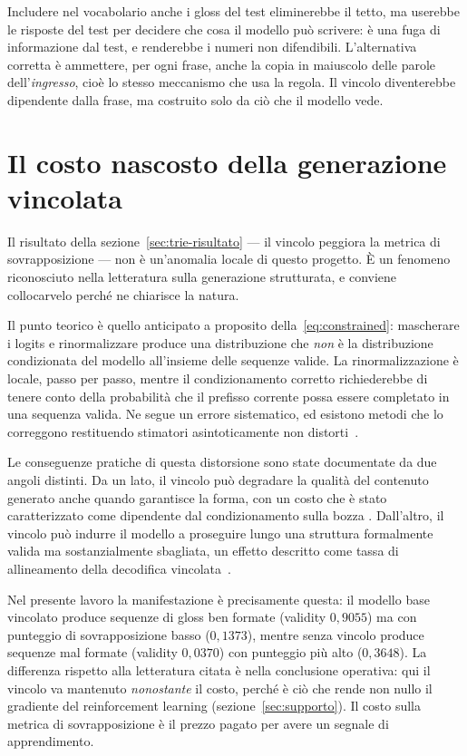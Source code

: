 Includere nel vocabolario anche i gloss del test eliminerebbe il tetto, ma
userebbe le risposte del test per decidere che cosa il modello può scrivere: è
una fuga di informazione dal test, e renderebbe i numeri non difendibili.
L'alternativa corretta è ammettere, per ogni frase, anche la copia in maiuscolo
delle parole dell'\emph{ingresso}, cioè lo stesso meccanismo che usa la regola.
Il vincolo diventerebbe dipendente dalla frase, ma costruito solo da ciò che il
modello vede.

\section{Il costo nascosto della generazione vincolata}

Il risultato della sezione~\ref{sec:trie-risultato} --- il vincolo peggiora la
metrica di sovrapposizione --- non è un'anomalia locale di questo progetto. È
un fenomeno riconosciuto nella letteratura sulla generazione strutturata, e
conviene collocarvelo perché ne chiarisce la natura.

Il punto teorico è quello anticipato a proposito della~\eqref{eq:constrained}:
mascherare i logits e rinormalizzare produce una distribuzione che \emph{non} è
la distribuzione condizionata del modello all'insieme delle sequenze valide. La
rinormalizzazione è locale, passo per passo, mentre il condizionamento corretto
richiederebbe di tenere conto della probabilità che il prefisso corrente possa
essere completato in una sequenza valida. Ne segue un errore sistematico, ed
esistono metodi che lo correggono restituendo stimatori asintoticamente non
distorti~\cite{ye2504}.

Le conseguenze pratiche di questa distorsione sono state documentate da due
angoli distinti. Da un lato, il vincolo può degradare la qualità del contenuto
generato anche quando garantisce la forma, con un costo che è stato
caratterizzato come dipendente dal condizionamento sulla bozza
\cite{reddy2603}. Dall'altro, il vincolo può indurre il modello a proseguire
lungo una struttura formalmente valida ma sostanzialmente sbagliata, un effetto
descritto come tassa di allineamento della decodifica
vincolata~\cite{zhou2604}.

Nel presente lavoro la manifestazione è precisamente questa: il modello base
vincolato produce sequenze di gloss ben formate (validity $0{,}9055$) ma con
punteggio di sovrapposizione basso ($0{,}1373$), mentre senza vincolo produce
sequenze mal formate (validity $0{,}0370$) con punteggio più alto ($0{,}3648$).
La differenza rispetto alla letteratura citata è nella conclusione operativa:
qui il vincolo va mantenuto \emph{nonostante} il costo, perché è ciò che rende
non nullo il gradiente del reinforcement learning
(sezione~\ref{sec:supporto}). Il costo sulla metrica di sovrapposizione è il
prezzo pagato per avere un segnale di apprendimento.

